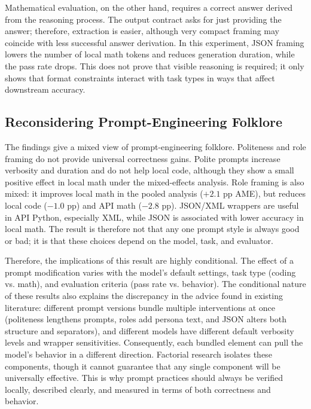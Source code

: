 \documentclass[a4paper,fleqn]{cas-sc}
\begin{document}
Mathematical evaluation, on the other hand, requires a correct answer derived from the reasoning process. The output contract asks for just providing the answer; therefore, extraction is easier, although very compact framing may coincide with less successful answer derivation. In this experiment, JSON framing lowers the number of local math tokens and reduces generation duration, while the pass rate drops. This does not prove that visible reasoning is required; it only shows that format constraints interact with task types in ways that affect downstream accuracy.

\subsection{Reconsidering Prompt-Engineering Folklore}\label{reconsidering-prompt-engineering-folklore}

The findings give a mixed view of prompt-engineering folklore. Politeness and role framing do not provide universal correctness gains. Polite prompts increase verbosity and duration and do not help local code, although they show a small positive effect in local math under the mixed-effects analysis. Role framing is also mixed: it improves local math in the pooled analysis ($+2.1$ pp AME), but reduces local code ($-1.0$ pp) and API math ($-2.8$ pp). JSON/XML wrappers are useful in API Python, especially XML, while JSON is associated with lower accuracy in local math. The result is therefore not that any one prompt style is always good or bad; it is that these choices depend on the model, task, and evaluator.

Therefore, the implications of this result are highly conditional. The effect of a prompt modification varies with the model's default settings, task type (coding vs. math), and evaluation criteria (pass rate vs. behavior). The conditional nature of these results also explains the discrepancy in the advice found in existing literature: different prompt versions bundle multiple interventions at once (politeness lengthens prompts, roles add persona text, and JSON alters both structure and separators), and different models have different default verbosity levels and wrapper sensitivities. Consequently, each bundled element can pull the model's behavior in a different direction. Factorial research isolates these components, though it cannot guarantee that any single component will be universally effective. This is why prompt practices should always be verified locally, described clearly, and measured in terms of both correctness and behavior.
\end{document}
